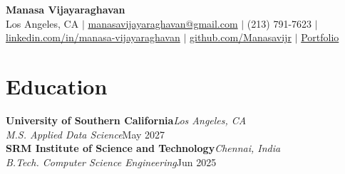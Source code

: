\documentclass[10pt, letterpaper]{article}
\begin{document}
\begin{center}
{\LARGE\bfseries Manasa Vijayaraghavan}\\[3pt]
Los Angeles, CA \;$|$\; \href{mailto:manasavijayaraghavan@gmail.com}{manasavijayaraghavan@gmail.com} \;$|$\; (213) 791-7623 \;$|$\; \href{https://linkedin.com/in/manasa-vijayaraghavan}{linkedin.com/in/manasa-vijayaraghavan} \;$|$\; \href{https://github.com/Manasavijr}{github.com/Manasavijr} \;$|$\; \href{https://manasavijayaraghavan.vercel.app}{Portfolio}
\end{center}
\vspace{1pt}

\section{Education}
\noindent\textbf{University of Southern California}\hfill\textit{Los Angeles, CA}\\
\textit{M.S. Applied Data Science}\hfill May 2027\\[3pt]
\noindent\textbf{SRM Institute of Science and Technology}\hfill\textit{Chennai, India}\\
\textit{B.Tech. Computer Science Engineering}\hfill Jun 2025

\end{document}
